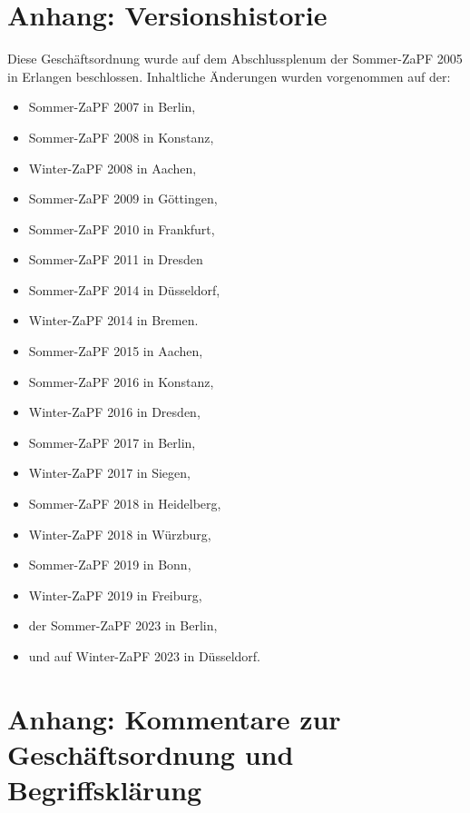 \documentclass[
  a4paper,
  oneside]{scrartcl}
\providecommand{\tightlist}{%
  \setlength{\itemsep}{0pt}\setlength{\parskip}{0pt}}
\begin{document}
\hypertarget{anhang-versionshistorie}{%
\section*{Anhang: Versionshistorie}\label{anhang-versionshistorie}}

Diese Geschäftsordnung wurde auf dem Abschlussplenum der Sommer-ZaPF
2005 in Erlangen beschlossen. Inhaltliche Änderungen wurden vorgenommen
auf der:

\begin{itemize}
\tightlist
\item
  Sommer-ZaPF 2007 in Berlin,
\item
  Sommer-ZaPF 2008 in Konstanz,
\item
  Winter-ZaPF 2008 in Aachen,
\item
  Sommer-ZaPF 2009 in Göttingen,
\item
  Sommer-ZaPF 2010 in Frankfurt,
\item
  Sommer-ZaPF 2011 in Dresden
\item
  Sommer-ZaPF 2014 in Düsseldorf,
\item
  Winter-ZaPF 2014 in Bremen.
\item
  Sommer-ZaPF 2015 in Aachen,
\item
  Sommer-ZaPF 2016 in Konstanz,
\item
  Winter-ZaPF 2016 in Dresden,
\item
  Sommer-ZaPF 2017 in Berlin,
\item
  Winter-ZaPF 2017 in Siegen,
\item
  Sommer-ZaPF 2018 in Heidelberg,
\item
  Winter-ZaPF 2018 in Würzburg,
\item
  Sommer-ZaPF 2019 in Bonn,
\item
  Winter-ZaPF 2019 in Freiburg,
\item
  der Sommer-ZaPF 2023 in Berlin,
\item
  und auf Winter-ZaPF 2023 in Düsseldorf.
\end{itemize}

\hypertarget{anhang-kommentare-zur-geschuxe4ftsordnung-und-begriffskluxe4rung}{%
\section*{Anhang: Kommentare zur Geschäftsordnung und
Begriffsklärung}\label{anhang-kommentare-zur-geschuxe4ftsordnung-und-begriffskluxe4rung}}
\end{document}
